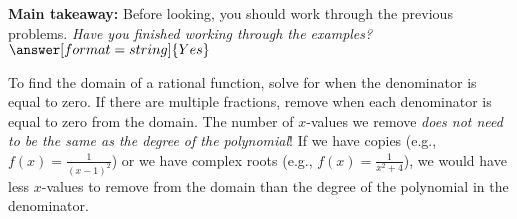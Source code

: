 \documentclass{ximera}
\begin{document}
\begin{question}
\textbf{Main takeaway:} Before looking, you should work through the previous problems. \textit{Have you finished working through the examples?} $\answer[format=string]{Yes}$
\begin{feedback}[correct]
To find the domain of a rational function, solve for when the denominator is equal to zero. If there are multiple fractions, remove when each denominator is equal to zero from the domain. The number of $x$-values we remove \textit{does not need to be the same as the degree of the polynomial}! If we have copies (e.g., $f(x) = \frac{1}{(x-1)^2}$) or we have complex roots (e.g., $f(x) = \frac{1}{x^2 + 4}$), we would have less $x$-values to remove from the domain than the degree of the polynomial in the denominator.
\end{feedback}
\end{question}
\end{document}
